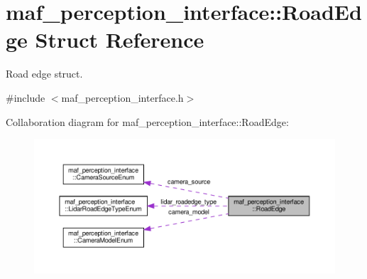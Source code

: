 \hypertarget{structmaf__perception__interface_1_1RoadEdge}{}\section{maf\+\_\+perception\+\_\+interface\+:\+:Road\+Edge Struct Reference}
\label{structmaf__perception__interface_1_1RoadEdge}


Road edge struct.  




{\ttfamily \#include $<$maf\+\_\+perception\+\_\+interface.\+h$>$}



Collaboration diagram for maf\+\_\+perception\+\_\+interface\+:\+:Road\+Edge\+:\nopagebreak
\begin{figure}[H]
\begin{center}
\leavevmode
\includegraphics[width=350pt]{structmaf__perception__interface_1_1RoadEdge__coll__graph}
\end{center}
\end{figure}
